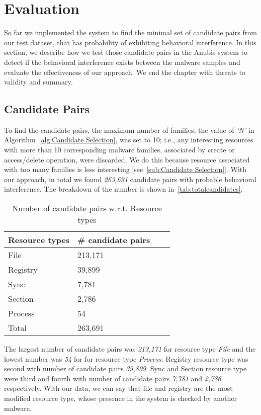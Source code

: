 \chapter{Evaluation}
\label{chapter:evaluation}
So far we implemented the system to find the minimal set of candidate pairs from our test dataset, that has probability of exhibiting behavioral interference.
In this section, we describe how we test those candidate pairs in the Anubis system to detect if the behavioral interference exists between the malware samples and evaluate the effectiveness of our approach.
We end the chapter with threats to validity and summary.
\section{Candidate Pairs}
\label{sec:Candidate Pairs}
To find the candidate pairs, the maximum number of families, the value of \emph{`N'} in Algorithm~\autoref{alg:Candidate Selection}, was set to 10;
i.e., any interesting resources with more than 10 corresponding malware families, associated by create or access/delete operation, were discarded.
We do this because resource associated with too many families is less interesting [see~\autoref{sub:Candidate Selection}].
With our approach, in total we found \emph{263,691} candidate pairs with probable behavioral interference.
The breakdown of the number is shown in~\autoref{tab:totalcandidates}.

\begin{table}[ht]
  \caption[Number of probable candidate pairs w.r.t. Resource types]{Number of candidate pairs w.r.t. Resource types}\label{tab:totalcandidates}
  \centering
  \begin{tabular}{l l l l}
    \toprule
    Resource types & \# candidate pairs\\
    \midrule
    File & 213,171 \\
    Registry & 39,899 \\
    Sync & 7,781 \\
    Section & 2,786 \\
    Process & 54\\
    \bottomrule
    Total & 263,691\\
  \end{tabular}
\end{table}
The largest number of candidate pairs was \emph{213,171} for resource type \emph{File} and the lowest number was \emph{54} for for resource type \emph{Process}.
Registry resource type was second with number of candidate pairs \emph{39,899}.
Sync and Section resource type were third and fourth with number of candidate pairs \emph{7,781} and \emph{2,786} respectively.
With our data, we can say that file and registry are the most modified resource type, whose presence in the system is checked by another malware.\\

